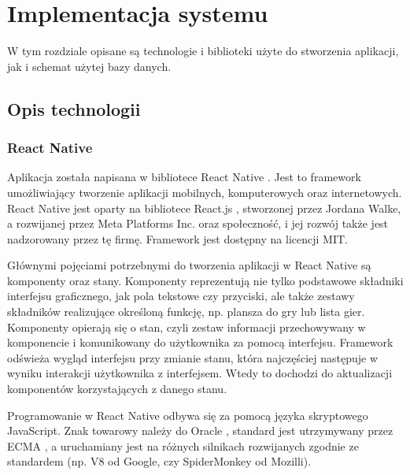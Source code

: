 \chapter{Implementacja systemu}
\thispagestyle{chapterBeginStyle}

	W tym rozdziale opisane są technologie i biblioteki użyte do stworzenia aplikacji, jak i schemat 
użytej bazy danych.



\section{Opis technologii}


\subsection{React Native}
	Aplikacja została napisana w bibliotece React Native \cite{React-Native}. Jest to framework
umożliwiający tworzenie aplikacji mobilnych, komputerowych oraz internetowych. React Native jest oparty
na bibliotece React.js \cite{React-Js}, stworzonej przez Jordana Walke, a rozwijanej przez
Meta Platforms Inc. oraz społeczność, i jej rozwój także jest nadzorowany przez tę firmę. Framework
jest dostępny na licencji MIT.

	Głównymi pojęciami potrzebnymi do tworzenia aplikacji w React Native są komponenty oraz stany.
Komponenty reprezentują nie tylko podstawowe składniki interfejsu graficznego, jak pola tekstowe czy 
przyciski, ale także zestawy składników realizujące określoną funkcję, np. plansza do gry lub
lista gier. Komponenty opierają się o stan, czyli zestaw informacji przechowywany w komponencie i
komunikowany do użytkownika za pomocą interfejsu. Framework odświeża wygląd interfejsu przy zmianie
stanu, która najczęściej następuje w wyniku interakcji użytkownika z interfejsem. Wtedy to dochodzi
do aktualizacji komponentów korzystających z danego stanu.

	Programowanie w React Native odbywa się za pomocą języka skryptowego JavaScript. Znak towarowy
należy do Oracle \cite{JS-Oracle}, standard jest utrzymywany przez ECMA \cite{JS-ECMA}, 
a uruchamiany jest na różnych silnikach rozwijanych zgodnie ze standardem 
(np. V8 \cite{JS-V8} od Google, czy SpiderMonkey \cite{JS-SpiderMonkey} od Mozilli).


